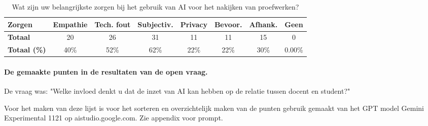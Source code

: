 \documentclass[12pt]{article}
\begin{document}
\noindent
\begin{table}[H]
    \caption{Wat zijn uw belangrijkste zorgen bij het gebruik van AI voor het nakijken van proefwerken? }
    \begin{tabular}{l c c c c c c c}
        \toprule
        \textbf{Zorgen} & \textbf{Empathie} & \textbf{Tech. fout} & \textbf{Subjectiv.} & \textbf{Privacy} & \textbf{Bevoor.} & \textbf{Afhank.} & \textbf{Geen} \\
        \midrule
        \textbf{Totaal} & 20 & 26 & 31 & 11 & 11 & 15 & 0  \\
        \textbf{Totaal (\%)} & 40\% & 52\% & 62\% & 22\% & 22\% & 30\% & 0.00\% \\
        \bottomrule
    \end{tabular}
\end{table}

\paragraph*{De gemaakte punten in de resultaten van de open vraag.}

De vraag was: "Welke invloed denkt u dat de inzet van AI kan hebben op de relatie tussen docent en student?"

Voor het maken van deze lijst is voor het sorteren en overzichtelijk maken van de punten gebruik gemaakt van het GPT model Gemini Experimental 1121 op aistudio.google.com. Zie appendix voor prompt.
\end{document}
